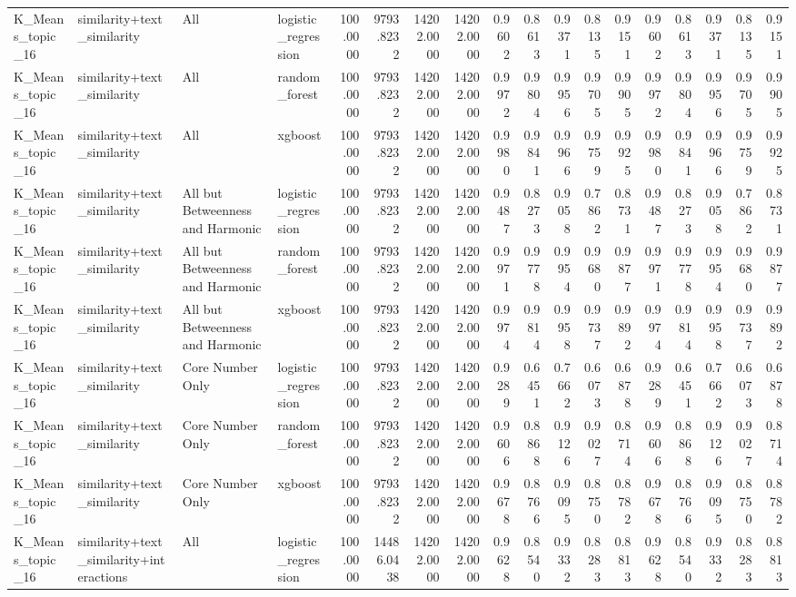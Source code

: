 \begin{tabular}{llllrrrrrrrrrrrrrr}
K_Means_topic_16 & similarity+text_similarity & All & logistic_regression & 100.0000 & 9793.8232 & 14202.0000 & 14202.0000 & 0.9602 & 0.8613 & 0.9371 & 0.8135 & 0.9151 & 0.9602 & 0.8613 & 0.9371 & 0.8135 & 0.9151 \\
K_Means_topic_16 & similarity+text_similarity & All & random_forest & 100.0000 & 9793.8232 & 14202.0000 & 14202.0000 & 0.9972 & 0.9804 & 0.9956 & 0.9705 & 0.9905 & 0.9972 & 0.9804 & 0.9956 & 0.9705 & 0.9905 \\
K_Means_topic_16 & similarity+text_similarity & All & xgboost & 100.0000 & 9793.8232 & 14202.0000 & 14202.0000 & 0.9980 & 0.9841 & 0.9966 & 0.9759 & 0.9925 & 0.9980 & 0.9841 & 0.9966 & 0.9759 & 0.9925 \\
K_Means_topic_16 & similarity+text_similarity & All but Betweenness and Harmonic & logistic_regression & 100.0000 & 9793.8232 & 14202.0000 & 14202.0000 & 0.9487 & 0.8273 & 0.9058 & 0.7862 & 0.8731 & 0.9487 & 0.8273 & 0.9058 & 0.7862 & 0.8731 \\
K_Means_topic_16 & similarity+text_similarity & All but Betweenness and Harmonic & random_forest & 100.0000 & 9793.8232 & 14202.0000 & 14202.0000 & 0.9971 & 0.9778 & 0.9954 & 0.9680 & 0.9877 & 0.9971 & 0.9778 & 0.9954 & 0.9680 & 0.9877 \\
K_Means_topic_16 & similarity+text_similarity & All but Betweenness and Harmonic & xgboost & 100.0000 & 9793.8232 & 14202.0000 & 14202.0000 & 0.9974 & 0.9814 & 0.9958 & 0.9737 & 0.9892 & 0.9974 & 0.9814 & 0.9958 & 0.9737 & 0.9892 \\
K_Means_topic_16 & similarity+text_similarity & Core Number Only & logistic_regression & 100.0000 & 9793.8232 & 14202.0000 & 14202.0000 & 0.9289 & 0.6451 & 0.7662 & 0.6073 & 0.6878 & 0.9289 & 0.6451 & 0.7662 & 0.6073 & 0.6878 \\
K_Means_topic_16 & similarity+text_similarity & Core Number Only & random_forest & 100.0000 & 9793.8232 & 14202.0000 & 14202.0000 & 0.9606 & 0.8868 & 0.9126 & 0.9027 & 0.8714 & 0.9606 & 0.8868 & 0.9126 & 0.9027 & 0.8714 \\
K_Means_topic_16 & similarity+text_similarity & Core Number Only & xgboost & 100.0000 & 9793.8232 & 14202.0000 & 14202.0000 & 0.9678 & 0.8766 & 0.9095 & 0.8750 & 0.8782 & 0.9678 & 0.8766 & 0.9095 & 0.8750 & 0.8782 \\
K_Means_topic_16 & similarity+text_similarity+interactions & All & logistic_regression & 100.0000 & 14486.0438 & 14202.0000 & 14202.0000 & 0.9628 & 0.8540 & 0.9332 & 0.8283 & 0.8813 & 0.9628 & 0.8540 & 0.9332 & 0.8283 & 0.8813 \\

\end{tabular}
